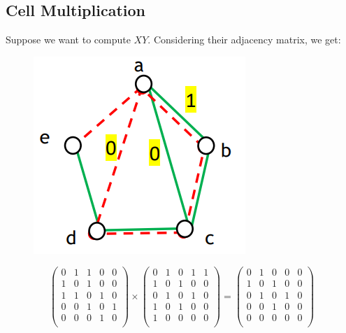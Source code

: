 \documentclass[
  notitlepage,
  onecolumn,
  openany]{book}
\begin{document}
\hypertarget{cell-multiplication}{%
\subsection{Cell Multiplication}\label{cell-multiplication}}

Suppose we want to compute \(XY\). Considering their adjacency matrix, we get:

\begin{figure}[h!]

{\centering \includegraphics[width=0.5\linewidth]{images/05-Matrices and Beta centrality/Untitled 2} 

}

\end{figure}

\[
\left(  
\begin{array}{ccccc}
0 & 1 & 1 & 0 & 0\\
1 & 0 & 1 & 0 & 0 \\
1 & 1 & 0 & 1 & 0 \\
0 & 0 & 1 & 0 & 1 \\
0 & 0 & 0 & 1 & 0 \\
\end{array}
\right)\times
\left(  
\begin{array}{ccccc}
0 & 1 & 0 & 1 & 1\\
1 & 0 & 1 & 0 & 0 \\
0 & 1 & 0 & 1 & 0 \\
1 & 0 & 1 & 0 & 0 \\
1 & 0 & 0 & 0 & 0 \\
\end{array}
\right) = 
\left(  
\begin{array}{ccccc}
0 & 1 & 0 & 0 & 0\\
1 & 0 & 1 & 0 & 0 \\
0 & 1 & 0 & 1 & 0 \\
0 & 0 & 1 & 0 & 0 \\
0 & 0 & 0 & 0 & 0 \\
\end{array}
\right)
\]
\end{document}
